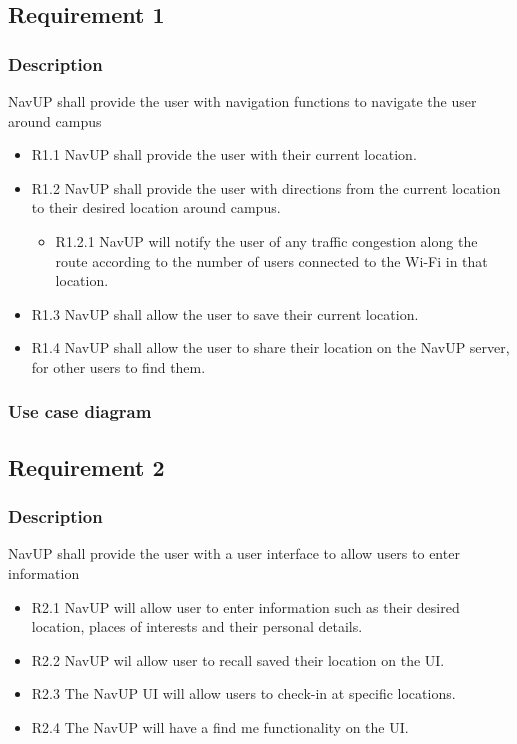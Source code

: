 \documentclass{article}
\begin{document}
    	\subsection{Requirement 1}
    	\subsubsection{Description}
    	NavUP shall provide the user with navigation functions to navigate the user around campus
        \begin{itemize}
        \item R1.1 NavUP shall provide the user with their current location.
        \item R1.2 NavUP shall provide the user with directions from the current location to their desired location around campus.
            \begin{itemize}
                \item R1.2.1 NavUP will notify the user of any traffic congestion along the route according to the number of users connected to the Wi-Fi in that location.
            \end{itemize}
        \item R1.3 NavUP shall allow the user to save their current location.
        \item R1.4 NavUP shall allow the user to share their location on the NavUP server, for other users to find them.
        \end{itemize}
        \subsubsection{Use case diagram}
        \subsection{Requirement 2}
        \subsubsection{Description}
        NavUP shall provide the user with a user interface to allow users to enter information
        \begin{itemize}
        \item R2.1 NavUP will allow user to enter information such as their desired location, places of interests and their personal details.
        \item R2.2 NavUP wil allow user to recall saved their location on the UI.
        \item R2.3 The NavUP UI will allow users to check-in at specific locations.
        \item R2.4 The NavUP will have a find me functionality on the UI.
        \end{itemize}
\end{document}
